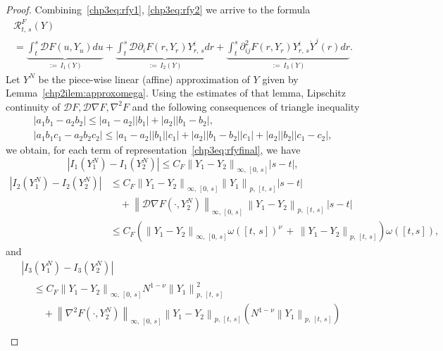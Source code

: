 \documentclass[10pt]{amsart}
\theoremstyle{definition}\newtheorem{defi}[theo]{Definition}\newtheorem{rema}[theo]{Remark}\newtheorem{exam}[theo]{Example}\newtheorem{exem}[theo]{Example}\newtheorem{nota}[theo]{Notation}
\newcommand{\calD}{\mathcal{D}}
\newcommand{\calR}{\mathcal{R}}
\begin{document}
\begin{proof}
Combining~\eqref{chp3eq:rfy1}, \eqref{chp3eq:rfy2} we arrive to the formula
\begin{multline}\label{chp3eq:rfyfinal}
\calR^{F}_{t,\,s}(Y)\\
=\underbrace{\int_t^s\calD F\left(u,Y_u\right)du}_{:=\,I_1(Y)}+\underbrace{\int_t^s\calD\partial_i F\left(r,Y_r\right)Y^i_{r,\,s}dr}_{:=\,I_2(Y)} +\underbrace{\int_t^s\partial^2_{ij} F\left(r,Y_r\right)Y^i_{r,\,s}\dot Y^j(r)dr}_{:=\,I_3(Y)}.
\end{multline}
Let $Y^N$ be the piece-wise linear (affine) approximation of $Y$ given by Lemma~\ref{chp2ilem:approxomega}. Using the estimates of that lemma, Lipschitz continuity of $\calD F, \calD\nabla F,\nabla ^2 F$ and the following consequences of triangle inequality
\begin{gather*}
\left|a_1b_1-a_2b_2\right|\leq \left|a_1-a_2\right|\left|b_1\right|+\left|a_2\right|\left|b_1-b_2\right|,
\\
\left|a_1b_1c_1-a_2b_2c_2\right|\leq \left|a_1-a_2\right|\left|b_1\right|\left|c_1\right|+\left|a_2\right|\left|b_1-b_2\right|\left|c_1\right|+\left|a_2\right|\left|b_2\right|\left|c_1-c_2\right|,
\end{gather*}
we obtain, for each term of representation~\eqref{chp3eq:rfyfinal}, we have
\[
\left|I_1\left(Y_1^N\right)-I_1\left(Y^N_2\right)\right|\leq C_F\left\|Y_1-Y_2\right\|_{\infty,\,[0,\,s]}|s-t|,
\]
\begin{align*}
\left|I_2\left(Y_1^N\right)-I_2\left(Y^N_2\right)\right|
&\leq C_F\left\|Y_1-Y_2\right\|_{\infty,\,[0,\,s]}\left\|Y_1\right\|_{p,\,[t,\,s]}|s-t|\\
&\quad+\left\|\calD\nabla F\left(\cdot, Y^N_2\right)\right\|_{\infty,\,[0,\,s]}\, \left\|Y_1-Y_2\right\|_{p,\,[t,\,s]}\, |s-t|\\
&\leq C_{F}\left(\left\|Y_1-Y_2\right\|_{\infty,\,[0,\,s]} \omega\left([t,\,s]\right)^{\nu}\, +\,\left\|Y_1-Y_2\right\|_{p,\,[t,\,s]}\right) \omega([t,s]),
\end{align*}
and
\begin{multline*}
\left|I_3\left(Y_1^N\right)-I_3\left(Y^N_2\right)\right|\\
\begin{aligned}
&\leq C_F\left\|Y_1-Y_2\right\|_{\infty,\,[0,\,s]} N^{1-\nu}\left\|Y_1\right\|^2_{p,\,[t,\,s]}\\
&\quad+\left\|\nabla^2 F\left(\cdot, Y^N_2\right)\right\|_{\infty,\,[0,\,s]}\left\|Y_1-Y_2\right\|_{p,\,[t,\,s]} \left(N^{1-\nu}\left\|Y_1\right\|_{p,\,[t,\,s]}\right)\\

\end{aligned}
\end{multline*}
\end{proof}
\end{document}

